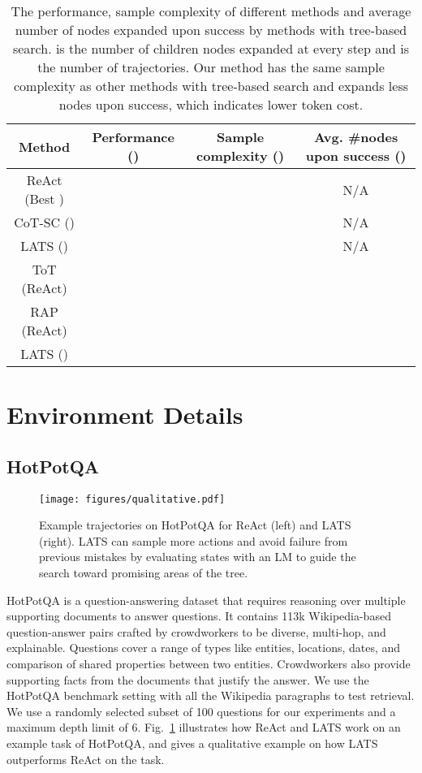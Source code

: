 \documentclass{article} \usepackage{iclr2024_conference,times}
\begin{document}
{\begin{table}[h]
    
    \small
    \centering
    \begin{tabular}{c|c|c|c}
        Method & Performance () & Sample complexity () & Avg. \#nodes upon success () \\
        \hline
         ReAct (Best ) &  &  & N/A  \\
         CoT-SC () &  &  & N/A  \\
         LATS () &  &  & N/A  \\
         ToT (ReAct) &  &  &   \\
         RAP (ReAct) &  &  &   \\
         LATS () &  &  & \\
    \end{tabular}
    \caption{ The performance, sample complexity of different methods and average number of nodes expanded upon success by methods with tree-based search.  is the number of children nodes expanded at every step and  is the number of trajectories. Our method has the same sample complexity as other methods with tree-based search and expands less nodes upon success, which indicates lower token cost.}
    \label{tab:cost}
\end{table}
}

\section{Environment Details}
\label{sec:envdetail}
\subsection{HotPotQA}

\begin{figure}[t]
    \centering
    \texttt{[image: figures/qualitative.pdf]}
    \caption{{Example trajectories on} HotPotQA for ReAct (left) and LATS (right). LATS can sample more actions and avoid failure from previous mistakes by evaluating states with an LM to guide the search toward promising areas of the tree.}
    \label{fig:qualitative}
    \vspace{-0.1in}
\end{figure}

HotPotQA \citep{yang2018hotpotqa} is a question-answering dataset that requires reasoning over multiple supporting documents to answer questions. It contains 113k Wikipedia-based question-answer pairs crafted by crowdworkers to be diverse, multi-hop, and explainable. Questions cover a range of types like entities, locations, dates, and comparison of shared properties between two entities. Crowdworkers also provide supporting facts from the documents that justify the answer. We use the HotPotQA benchmark setting with all the Wikipedia paragraphs to test retrieval. We use a randomly selected subset of 100 questions for our experiments and a maximum depth limit of 6. {Fig.~\ref{fig:qualitative} illustrates how ReAct and LATS work on an example task of HotPotQA, and gives a qualitative example on how LATS outperforms ReAct on the task. }
\end{document}
